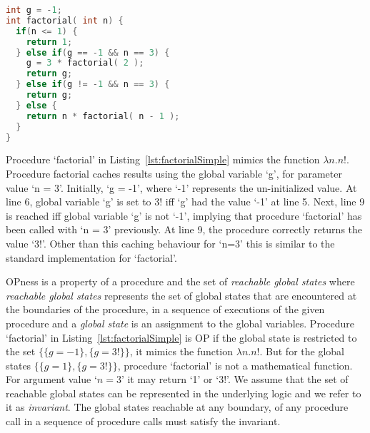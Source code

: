 \documentclass{llncs}
\begin{document}
\begin{lstlisting}[language=c, caption= {Procedure `factorial' :
      returns factorial of `n' and memoizes result for argument value
      `3'.}, label=lst:factorialSimple]
int g = -1;
int factorial( int n) {
  if(n <= 1) {
    return 1;
  } else if(g == -1 && n == 3) {
    g = 3 * factorial( 2 );
    return g;
  } else if(g != -1 && n == 3) {
    return g;
  } else {
    return n * factorial( n - 1 );
  }
}
\end{lstlisting}

Procedure `factorial' in Listing~\ref{lst:factorialSimple} mimics the
function $\lambda n. n!$. Procedure factorial caches results using the
global variable `g', for parameter value `n = 3'. Initially, `g = -1',
where `-1' represents the un-initialized value. At line 6, global
variable `g' is set to 3! iff `g' had the value `-1' at line
5. Next, line 9 is reached iff global variable `g' is not `-1',
implying that procedure `factorial' has been called with `n = 3'
previously. At line 9, the procedure correctly returns the value
`3!'. Other than this caching behaviour for `n=3' this is similar to
the standard implementation for `factorial'.


OPness is a property of a procedure and the set of \textit{reachable
  global states} where \textit{reachable global states} represents the
set of global states that are encountered at the boundaries of the procedure,
in a sequence of executions
of the given procedure  and a \textit{global state} is an assignment to
the global variables. Procedure `factorial' in
Listing~\ref{lst:factorialSimple} is OP if the global state is
restricted to the set $\{\{g = -1\}, \{g = 3!\}\}$, it mimics the
function $\lambda n.n!$. But for the global states $\{\{g = 1\}, \{g =
3!\}\}$, procedure `factorial' is not a mathematical function. For
argument value `$n = 3$' it may return `1' or `3!'.  We assume that
the set of reachable global states can be represented in the
underlying logic and we refer to it as \textit{invariant}.  The global
states reachable at any boundary, of any procedure call in a sequence
of procedure calls must satisfy the invariant.
\end{document}
